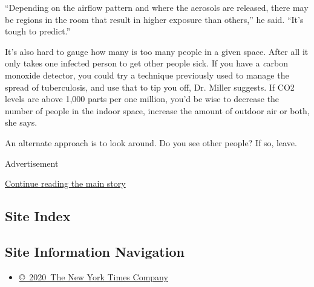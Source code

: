 ``Depending on the airflow pattern and where the aerosols are released,
there may be regions in the room that result in higher exposure than
others,'' he said. ``It's tough to predict.''

It's also hard to gauge how many is too many people in a given space.
After all it only takes one infected person to get other people sick. If
you have a \emph{c}arbon monoxide detector, you could try a technique
previously used to manage the spread of tuberculosis, and use that to
tip you off, Dr. Miller suggests. If CO2 levels are above 1,000 parts
per one million, you'd be wise to decrease the number of people in the
indoor space, increase the amount of outdoor air or both, she says.

An alternate approach is to look around. Do you see other people? If so,
leave.

Advertisement

\protect\hyperlink{after-bottom}{Continue reading the main story}

\hypertarget{site-index}{%
\subsection{Site Index}\label{site-index}}

\hypertarget{site-information-navigation}{%
\subsection{Site Information
Navigation}\label{site-information-navigation}}

\begin{itemize}
\tightlist
\item
  \href{https://help.nytimes.com/hc/en-us/articles/115014792127-Copyright-notice}{©~2020~The
  New York Times Company}
\end{itemize}

